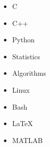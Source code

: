 

\begin{itemize}
  \item C
  \item C++
  \item Python
  \item Statistics
  \item Algorithms
  \item Linux
  \item Bash
  \item \LaTeX
  \item MATLAB

\end{itemize}
